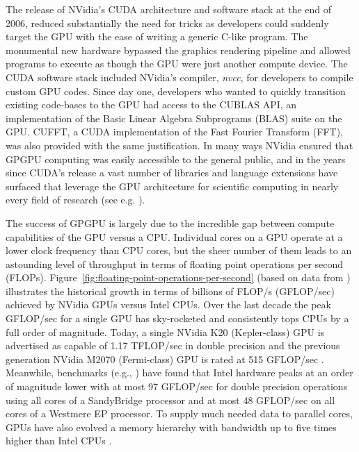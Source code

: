 \documentclass{report}
\begin{document}
The release of NVidia's CUDA architecture and software stack \cite{CudaGuide2013} at the end of 2006, reduced substantially the need for tricks as developers could suddenly target the GPU with the ease of writing a generic C-like program. The monumental new hardware bypassed the graphics rendering pipeline and allowed programs to execute as though the GPU were just another compute device. The CUDA software stack included NVidia's compiler, \emph{nvcc}, for developers to compile custom GPU codes. Since day one, developers who wanted to quickly transition existing code-bases to the GPU had access to the CUBLAS API, an implementation of the Basic Linear Algebra Subprograms (BLAS) suite on the GPU. CUFFT, a CUDA implementation of the Fast Fourier Transform (FFT), was also provided with the same justification. In many ways NVidia ensured that GPGPU computing was easily accessible to the general public, and in the years since CUDA's release a vast number of libraries and language extensions have surfaced that leverage the GPU architecture for scientific computing in nearly every field of research (see e.g. \cite{NVidiaExamples}). 


The success of GPGPU is largely due to the incredible gap between compute capabilities of the GPU versus a CPU. Individual cores on a GPU operate at a lower clock frequency than CPU cores, but the sheer number of them leads to an astounding level of throughput in terms of floating point operations per second (FLOPs). Figure~\ref{fig:floating-point-operations-per-second} (based on data from \cite{Behr2009, OpenCL2009}) illustrates the historical growth in terms of billions of FLOP/s (GFLOP/sec) achieved by NVidia GPUs versus Intel CPUs. Over the last decade the peak GFLOP/sec for a single GPU has sky-rocketed and consistently tops CPUs by a full order of magnitude. Today, a single NVidia K20 (Kepler-class) GPU is advertised as capable of 1.17 TFLOP/sec in double precision \cite{KeplerFactSheet} and the previous generation NVidia M2070 (Fermi-class) GPU is rated at 515 GFLOP/sec \cite{Fermi2009}. Meanwhile, benchmarks (e.g., \cite{Vladimirov2012}) have found that Intel hardware peaks at an order of magnitude lower with at most 97 GFLOP/sec for double precision operations using all cores of a SandyBridge processor and at most 48 GFLOP/sec on all cores of a Westmere EP processor. To supply much needed data to parallel cores, GPUs have also evolved a memory hierarchy with bandwidth up to five times higher than Intel CPUs \cite{CudaGuide2013}.
\end{document}
